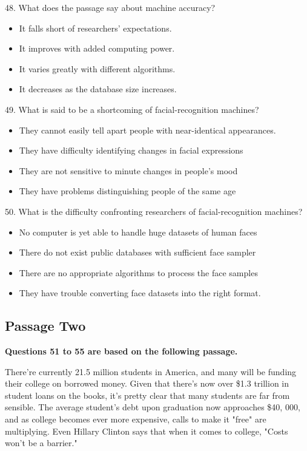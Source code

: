\documentclass[UTF8,11pt]{ctexart}
\begin{document}
48. What does the passage say about machine accuracy?


\begin{itemize}[leftmargin=2em,itemsep=.2em,topsep=.4em]\item[A.] It falls short of researchers' expectations.
\item[B.] It improves with added computing power.
\item[C.] It varies greatly with different algorithms.
\item[D.] It decreases as the database size increases.
\end{itemize}

49. What is said to be a shortcoming of facial-recognition machines?


\begin{itemize}[leftmargin=2em,itemsep=.2em,topsep=.4em]\item[A.] They cannot easily tell apart people with near-identical appearances.
\item[B.] They have difficulty identifying changes in facial expressions
\item[C.] They are not sensitive to minute changes in people's mood
\item[D.] They have problems distinguishing people of the same age
\end{itemize}

50. What is the difficulty confronting researchers of facial-recognition machines?


\begin{itemize}[leftmargin=2em,itemsep=.2em,topsep=.4em]\item[A.] No computer is yet able to handle huge datasets of human faces
\item[B.] There do not exist public databases with sufficient face sampler
\item[C.] There are no appropriate algorithms to process the face samples
\item[D.] They have trouble converting face datasets into the right format.
\end{itemize}

\subsection*{\textbf{Passage Two}}


\textbf{Questions 51 to 55 are based on the following passage.}


There’re currently 21.5 million students in America, and many will be funding their college on borrowed money. Given that there's now over \$1.3 trillion in student loans on the books, it's pretty clear that many students are far from sensible. The average student's debt upon graduation now approaches \$40, 000, and as college becomes ever more expensive, calls to make it "free" are multiplying. Even Hillary Clinton says that when it comes to college, "Costs won't be a barrier."
\end{document}
